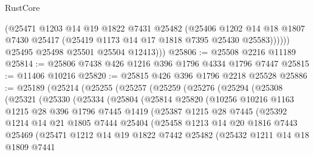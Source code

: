 \begin{lexlean}{RustCore}
\begin{coremodule}
                (@25471
                  @1203
                  @14
                  @19
                  @1822
                  @7431
                  @25482
                  (@25406
                    @1202
                    @14
                    @18
                    @1807
                    @7430
                    @25417
                    (@25419 @1173 @14 @17 @1818 @7395 @25430 @25583))))))
          @25495
          @25498
          @25501
          @25504
          @12413)))
@25806 := @25508 @2216 @11189
@25814 := @25806 @7438 @426 @1216 @396 @1796 @4334 @1796 @7447
@25815 := @11406 @10216
@25820 := @25815 @426 @396 @1796 @2218 @25528
@25886 := @25189
    (@25214
      (@25255
        (@25257
          (@25259
            (@25276
              (@25294
                (@25308
                  (@25321
                    (@25330
                      (@25334
                        (@25804
                          (@25814
                            @25820
                            (@10256
                              @10216
                              @1163
                              @1215
                              @28
                              @396
                              @1796
                              @7445
                              @1419
                              (@25387
                                @1215
                                @28
                                @7445
                                (@25392
                                  @1214
                                  @14
                                  @21
                                  @1805
                                  @7444
                                  @25404
                                  (@25458
                                    @1213
                                    @14
                                    @20
                                    @1816
                                    @7443
                                    @25469
                                    (@25471
                                      @1212
                                      @14
                                      @19
                                      @1822
                                      @7442
                                      @25482
                                      (@25432
                                        @1211
                                        @14
                                        @18
                                        @1809
                                        @7441

\end{coremodule}
\end{lexlean}
